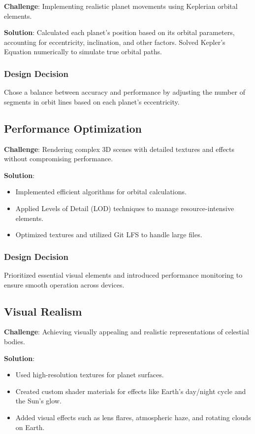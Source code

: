 \documentclass[12pt, a4paper]{article}
\begin{document}
\textbf{Challenge}: Implementing realistic planet movements using Keplerian orbital elements.

\textbf{Solution}: Calculated each planet's position based on its orbital parameters, accounting for eccentricity, inclination, and other factors. Solved Kepler's Equation numerically to simulate true orbital paths.

\subsubsection{Design Decision}

Chose a balance between accuracy and performance by adjusting the number of
segments in orbit lines based on each planet's eccentricity.

\subsection{Performance Optimization}

\textbf{Challenge}: Rendering complex 3D scenes with detailed textures and effects without compromising performance.

\textbf{Solution}:

\begin{itemize}
    \item Implemented efficient algorithms for orbital calculations.
    \item Applied Levels of Detail (LOD) techniques to manage resource-intensive
          elements.
    \item Optimized textures and utilized Git LFS to handle large files.
\end{itemize}

\subsubsection{Design Decision}

Prioritized essential visual elements and introduced performance monitoring to
ensure smooth operation across devices.

\subsection{Visual Realism}

\textbf{Challenge}: Achieving visually appealing and realistic representations of celestial bodies.

\textbf{Solution}:

\begin{itemize}
    \item Used high-resolution textures for planet surfaces.
    \item Created custom shader materials for effects like Earth's day/night cycle and
          the Sun's glow.
    \item Added visual effects such as lens flares, atmospheric haze, and rotating clouds
          on Earth.
\end{itemize}
\end{document}
